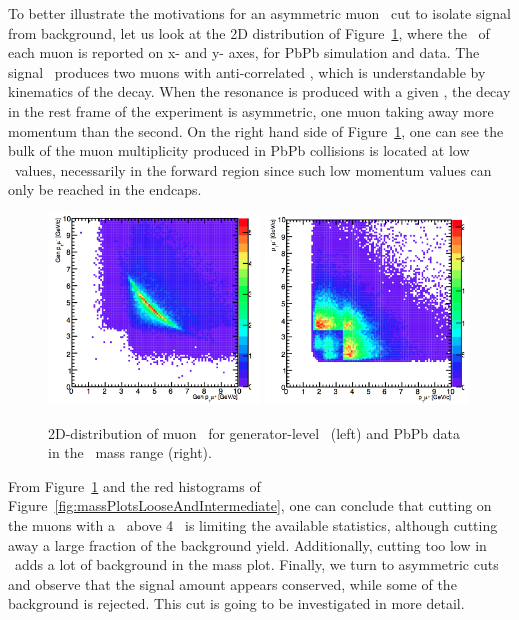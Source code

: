 To better illustrate the motivations for an asymmetric muon \pt\ cut to
isolate signal from background, let us look at the 2D distribution of
Figure~\ref{fig:twoMuonsPt}, where the \pt\ of each muon is reported on
x- and y- axes, for PbPb simulation and data.  The signal \PgU\ produces two muons with
anti-correlated \pt, which is understandable by kinematics of the
decay. When the resonance is produced with a given \pt, the decay in
the rest frame of the experiment is asymmetric, one muon taking away
more momentum than the second. On the right hand side of
Figure~\ref{fig:twoMuonsPt}, one can see
the bulk of the muon multiplicity produced in PbPb collisions is
located at low \pt\ values, necessarily in the forward region since
such low momentum values can only be reached in the endcaps.

\begin{figure}[h]
\begin{center}
\includegraphics[width=0.50\textwidth]{Chapters/aYield/Gen_mupt_vs_mupt.png}  
\includegraphics[width=0.48\textwidth]{Chapters/aYield/Data_mupt_vs_mupt.png}  
\caption{2D-distribution of muon \pt\ for generator-level \PgU\ (left)
  and
  PbPb data in the \PgU\ mass range (right).}
\label{fig:twoMuonsPt}
\end{center}
\end{figure}

From Figure~\ref{fig:twoMuonsPt} and the red histograms of
Figure~\ref{fig:massPlotsLooseAndIntermediate}, one can conclude that
cutting on the muons with a \pt\ above 4 \GeVc\ is limiting the available
statistics, although cutting away a large fraction of the background
yield. Additionally, cutting too low in \pt\ adds a lot of background
in the mass plot. Finally, we turn to asymmetric cuts and observe that
the signal amount appears conserved, while some of the background is
rejected. This cut is going to be investigated in more detail.

